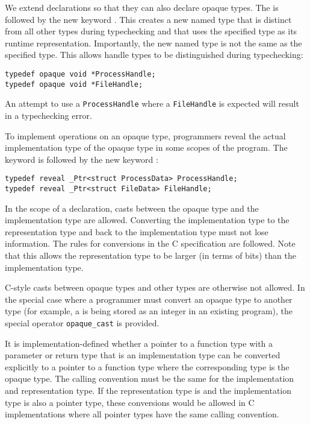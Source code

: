 We extend  declarations so that they can also declare opaque types. 
The  is followed by the new keyword .
This creates a new named type that is distinct from all other types during
typechecking and that uses the specified type as its runtime representation.
Importantly, the new named type is not the same as the specified type.  This allows
handle types to be distinguished during typechecking:
\begin{lstlisting}
typedef opaque void *ProcessHandle;
typedef opaque void *FileHandle;
\end{lstlisting}
An attempt to use a \lstinline+ProcessHandle+ where a \lstinline+FileHandle+ 
is expected will result in a typechecking error.

To implement operations on an opaque type,
programmers reveal the actual implementation type of the opaque type
in some scopes of the program.  The
keyword  is followed by the new keyword :
\begin{lstlisting}
typedef reveal _Ptr<struct ProcessData> ProcessHandle;
typedef reveal _Ptr<struct FileData> FileHandle;
\end{lstlisting}
In the scope of a  declaration, casts between the
opaque type and the implementation type are allowed.  
Converting the implementation type to the representation
type and back to the implementation type must not lose information.  
The rules for conversions in the C specification are followed.   Note that 
this allows the representation type to be larger (in terms of bits) than the implementation type.

C-style casts between opaque types and other types are otherwise not allowed.
In the special case where a programmer must convert an opaque type to another
type (for example, a \uncheckedptrvoid{} is being stored as an integer in an existing
program), the special operator \lstinline|opaque_cast| is provided.

It is implementation-defined whether a pointer to a function type with a
parameter or return type that is an implementation type can be converted
explicitly to a pointer to a function type where the corresponding type
is the opaque type.   The calling convention must be the same for
the implementation and representation type.  If the representation type is \uncheckedptrvoid{}
and the implementation type is also a pointer type,  these conversions would be
allowed in C implementations where all pointer types have the same calling convention.

